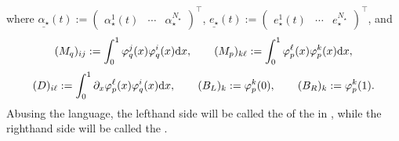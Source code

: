 \documentclass[letterpaper,10pt,english]{sphinxmanual}
\begin{document}
\sphinxAtStartPar
where
\(\underline{\alpha_\star}(t) := \begin{pmatrix} \alpha_\star^1(t) & \cdots & \alpha_\star^{N_\star} \end{pmatrix}^\top\),
\(\underline{e_\star}(t) := \begin{pmatrix} e_\star^1(t) & \cdots & e_\star^{N_\star} \end{pmatrix}^\top\),
and
\begin{equation*}
\begin{split}(M_q)_{ij} := \int_0^1 \varphi_q^j(x) \varphi_q^i(x) {\rm d}x,
\qquad
(M_p)_{k\ell} := \int_0^1 \varphi_p^\ell(x) \varphi_p^k(x) {\rm d}x,\end{split}
\end{equation*}\begin{equation*}
\begin{split}(D)_{i\ell} := \int_0^1 \partial_x \varphi_p^\ell(x) \varphi_q^i(x) {\rm d}x,
\qquad
(B_L)_{k} := \varphi_p^k(0),
\qquad
(B_R)_{k} := \varphi_p^k(1).\end{split}
\end{equation*}
\sphinxAtStartPar
Abusing the language, the left\sphinxhyphen{}hand side will be called the  of
the  in , while the right\sphinxhyphen{}hand side will be
called the .
\end{document}
